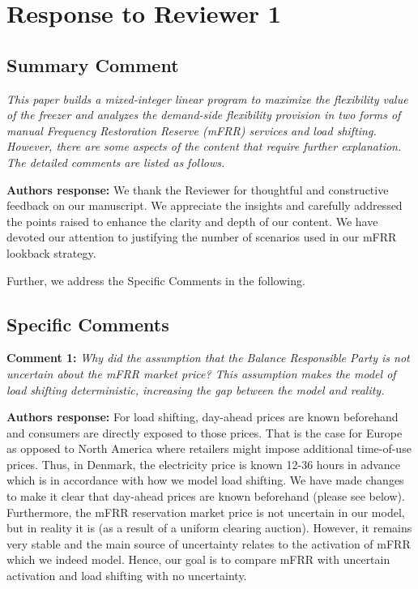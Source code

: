 \documentclass[10pt]{article}
\newcommand{\auth}{\textbf{Authors response: }}
\begin{document}
\newpage
\section{Response to Reviewer 1}

\subsection{Summary Comment} \textit{This paper builds a mixed-integer linear program to maximize the flexibility value of the freezer and analyzes the demand-side flexibility provision in two forms of manual Frequency Restoration Reserve (mFRR) services and load shifting. However, there are some aspects of the content that require further explanation. The detailed comments are listed as follows.}

\auth We thank the Reviewer for thoughtful and constructive feedback on our manuscript. We appreciate the insights and carefully addressed the points raised to enhance the clarity and depth of our content. We have devoted our attention to justifying the number of scenarios used in our mFRR lookback strategy.

Further, we address the Specific Comments in the following.

\subsection{Specific Comments}
\textbf{Comment 1:} \textit{Why did the assumption that the Balance Responsible Party is not uncertain about the mFRR market price? This assumption makes the model of load shifting deterministic, increasing the gap between the model and reality.}

\auth For load shifting, day-ahead prices are known beforehand and consumers are directly exposed to those prices. That is the case for Europe as opposed to North America where retailers might impose additional time-of-use prices. Thus, in Denmark, the electricity price is known 12-36 hours in advance which is in accordance with how we model load shifting. We have made changes to make it clear that day-ahead prices are known beforehand (please see below). Furthermore, the mFRR reservation market price is not uncertain in our model, but in reality it is (as a result of a uniform clearing auction). However, it remains very stable and the main source of uncertainty relates to the activation of mFRR which we indeed model. Hence, our goal is to compare mFRR with uncertain activation and load shifting with no uncertainty.
\end{document}
